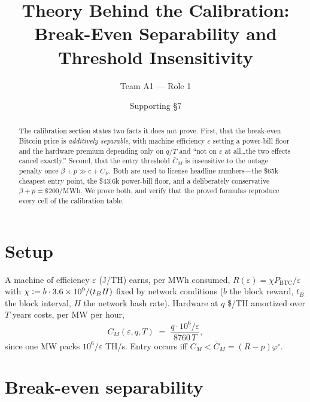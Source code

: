\documentclass[11pt,reqno]{amsart}
\theoremstyle{plain}\newtheorem{proposition}{Proposition}\newtheorem{corollary}[proposition]{Corollary}
\theoremstyle{remark}\newtheorem{remark}[proposition]{Remark}
\newcommand{\CM}{C_M}\newcommand{\CF}{C_F}\newcommand{\bp}{\beta+p}
\newcommand{\phio}{\varphi^{\circ}}\newcommand{\CMbar}{\bar C_M}\newcommand{\eqdef}{\vcentcolon=}
\begin{document}
\title[Theory behind the calibration]{Theory Behind the Calibration:\\
Break-Even Separability and Threshold Insensitivity}
\author{Team A1 --- Role 1}
\date{Supporting \S7}
\begin{abstract}
The calibration section states two facts it does not prove. First, that the break-even
Bitcoin price is \emph{additively separable}, with machine efficiency $\varepsilon$ setting
a power-bill floor and the hardware premium depending only on $q/T$ and ``not on
$\varepsilon$ at all\dots the two effects cancel exactly.'' Second, that the entry
threshold $\CMbar$ is insensitive to the outage penalty once $\bp\gg c+\CF$. Both are used
to license headline numbers---the \$65k cheapest entry point, the \$43.6k power-bill floor,
and a deliberately conservative $\bp=\$200$/MWh. We prove both, and verify that the proved
formulas reproduce every cell of the calibration table.
\end{abstract}
\maketitle

\section{Setup}
A machine of efficiency $\varepsilon$ (J/TH) earns, per MWh consumed,
$R(\varepsilon)=\chi P_{\mathrm{BTC}}/\varepsilon$ with
$\chi\eqdef b\cdot3.6\times10^{9}/(t_B H)$ fixed by network conditions ($b$ the block
reward, $t_B$ the block interval, $H$ the network hash rate). Hardware at $q$ \$/TH
amortized over $T$ years costs, per MW per hour,
\[
  \CM(\varepsilon,q,T)\;=\;\frac{q\cdot 10^{6}/\varepsilon}{8760\,T},
\]
since one MW packs $10^{6}/\varepsilon$ TH/s. Entry occurs iff $\CM<\CMbar=(R-p)\phio$.

\section{Break-even separability}
\end{document}
